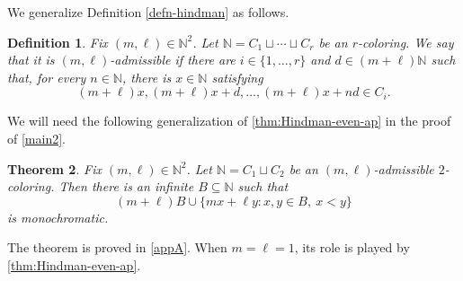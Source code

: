 \documentclass[reqno,12pt]{amsart}
\newtheorem{thm}{Theorem}[section]
\newtheorem{defn}[thm]{Definition}
\def \N {\mathbb N}
\numberwithin{equation}{section}
\begin{document}
We generalize Definition \cref{defn-hindman} as follows.

\begin{defn}\label{defn4-1}
	Fix $(m,\ell)\in\N^2$. Let
	$\N=C_1\sqcup\cdots\sqcup C_r$ be an $r$-coloring. We say that it is
	{\em $(m,\ell)$-admissible} if there are $i\in\{1,\ldots,r\}$ and
	$d\in(m+\ell)\N$ such that, for every $n\in\N$, there is $x\in\N$
	satisfying
	\[
	(m+\ell)x,(m+\ell)x+d,\ldots,(m+\ell)x+nd\in C_i.
	\]
\end{defn}

We will need the following generalization of \cref{thm:Hindman-even-ap} in the proof of \cref{main2}. 

\begin{thm}\label{thm2-1}
	Fix $(m,\ell)\in\N^2$. Let
	$\N=C_1\sqcup C_2$ be an $(m,\ell)$-admissible $2$-coloring. Then
	there is an infinite $B\subseteq\N$ such that
	\[
	(m+\ell)B\cup\{mx+\ell y:x,y\in B,\ x<y\}
	\]
	is monochromatic.
\end{thm}

The theorem is proved in \cref{appA}. When $m=\ell=1$, its role is played
by \cref{thm:Hindman-even-ap}.
\end{document}

